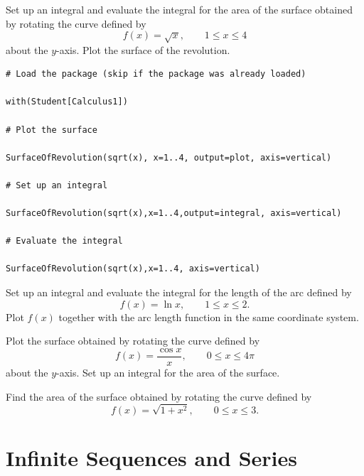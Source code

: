 \documentclass[en,11pt,simple]{elegantbook}
\let\BeginKnitrBlock\begin \let\EndKnitrBlock\end
\begin{document}
\BeginKnitrBlock{example}{}{}
\protect\hypertarget{exm:unnamed-chunk-216}{}{\label{exm:unnamed-chunk-216} }
Set up an integral and evaluate the integral for the area of the surface obtained by rotating the curve defined by
\[
f(x)=\sqrt{x},\qquad 1\leq x\leq 4
\]
about the \(y\)-axis. Plot the surface of the revolution.
\EndKnitrBlock{example}

\BeginKnitrBlock{solution}{}{}
{}

\begin{verbatim}
# Load the package (skip if the package was already loaded)

with(Student[Calculus1])

# Plot the surface

SurfaceOfRevolution(sqrt(x), x=1..4, output=plot, axis=vertical)

# Set up an integral

SurfaceOfRevolution(sqrt(x),x=1..4,output=integral, axis=vertical)

# Evaluate the integral

SurfaceOfRevolution(sqrt(x),x=1..4, axis=vertical)
\end{verbatim}
\EndKnitrBlock{solution}

\BeginKnitrBlock{exercise}{}{}
\protect\hypertarget{exr:unnamed-chunk-218}{}{\label{exr:unnamed-chunk-218} }
Set up an integral and evaluate the integral for the length of the arc defined by
\[
f(x)=\ln x, \qquad 1\leq x\leq 2.
\]
Plot \(f(x)\) together with the arc length function in the same coordinate system.
\EndKnitrBlock{exercise}

\BeginKnitrBlock{exercise}{}{}
\protect\hypertarget{exr:unnamed-chunk-219}{}{\label{exr:unnamed-chunk-219} }
Plot the surface obtained by rotating the curve defined by
\[
f(x)=\frac{\cos x}{x}, \qquad 0\leq x\leq 4\pi
\]
about the \(y\)-axis. Set up an integral for the area of the surface.
\EndKnitrBlock{exercise}

\BeginKnitrBlock{exercise}{}{}
\protect\hypertarget{exr:unnamed-chunk-220}{}{\label{exr:unnamed-chunk-220} }
Find the area of the surface obtained by rotating the curve defined by
\[
f(x)=\sqrt{1+x^2},\qquad 0\leq x\leq 3.
\]
\EndKnitrBlock{exercise}

\hypertarget{infinite-sequences-and-series}{%
\chapter{Infinite Sequences and Series}\label{infinite-sequences-and-series}}
\end{document}
